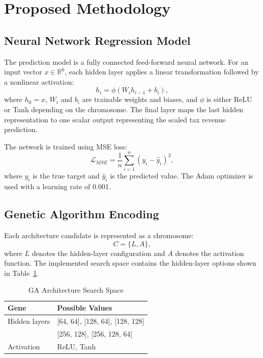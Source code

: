 \documentclass[conference]{IEEEtran}
\begin{document}
\section{Proposed Methodology}
\subsection{Neural Network Regression Model}
The prediction model is a fully connected feed-forward neural network. For an input vector $x \in \mathbb{R}^{6}$, each hidden layer applies a linear transformation followed by a nonlinear activation:
\begin{equation}
    h_i = \phi(W_i h_{i-1} + b_i),
\end{equation}
where $h_0=x$, $W_i$ and $b_i$ are trainable weights and biases, and $\phi$ is either ReLU or Tanh depending on the chromosome. The final layer maps the last hidden representation to one scalar output representing the scaled tax revenue prediction.

The network is trained using MSE loss:
\begin{equation}
    \mathcal{L}_{MSE} = \frac{1}{n}\sum_{i=1}^{n}(y_i-\hat{y}_i)^2,
\end{equation}
where $y_i$ is the true target and $\hat{y}_i$ is the predicted value. The Adam optimizer is used with a learning rate of 0.001.

\subsection{Genetic Algorithm Encoding}
Each architecture candidate is represented as a chromosome:
\begin{equation}
    C = \{L, A\},
\end{equation}
where $L$ denotes the hidden-layer configuration and $A$ denotes the activation function. The implemented search space contains the hidden-layer options shown in Table~\ref{tab:search_space}.

\begin{table}[htbp]
\caption{GA Architecture Search Space}
\centering
\begin{tabular}{ll}
\toprule
\textbf{Gene} & \textbf{Possible Values} \\
\midrule
Hidden layers & [64, 64], [128, 64], [128, 128] \\
 & [256, 128], [256, 128, 64] \\
Activation & ReLU, Tanh \\
\bottomrule
\end{tabular}
\label{tab:search_space}
\end{table}
\end{document}
